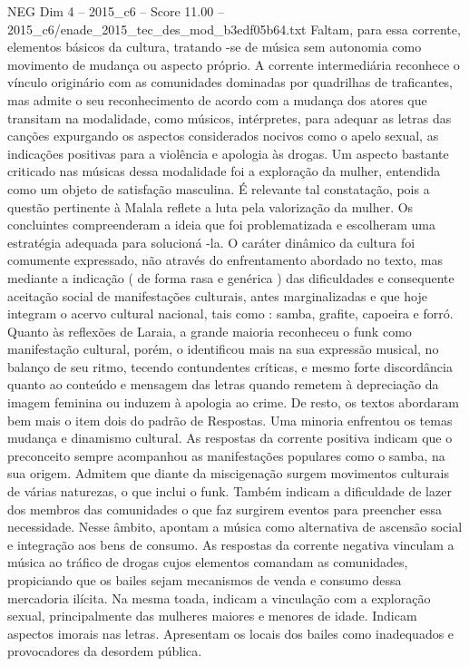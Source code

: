 \begin{textsample}{NEG Dim 4 – 2015\_c6 – Score 11.00 – 2015\_c6/enade\_2015\_tec\_des\_mod\_b3edf05b64.txt}
Faltam, para essa corrente, elementos básicos da cultura, tratando -se de música sem autonomia como movimento de mudança ou aspecto próprio.
A corrente intermediária reconhece o vínculo originário com as comunidades dominadas por quadrilhas de traficantes, mas admite o seu reconhecimento de acordo com a mudança dos atores que transitam na modalidade, como músicos, intérpretes, para adequar as letras das canções expurgando os aspectos considerados nocivos como o apelo sexual, as indicações positivas para a violência e apologia às drogas.
Um aspecto bastante criticado nas músicas dessa modalidade foi a exploração da mulher, entendida como um objeto de satisfação masculina.
É relevante tal constatação, pois a questão pertinente à Malala reflete a luta pela valorização da mulher.
Os concluintes compreenderam a ideia que foi problematizada e escolheram uma estratégia adequada para solucioná -la.
O caráter dinâmico da cultura foi comumente expressado, não através do enfrentamento abordado no texto, mas mediante a indicação ( de forma rasa e genérica ) das dificuldades e consequente aceitação social de manifestações culturais, antes marginalizadas e que hoje integram o acervo cultural nacional, tais como : samba, grafite, capoeira e forró.
Quanto às reflexões de Laraia, a grande maioria reconheceu o funk como manifestação cultural, porém, o identificou mais na sua expressão musical, no balanço de seu ritmo, tecendo contundentes críticas, e mesmo forte discordância quanto ao conteúdo e mensagem das letras quando remetem à depreciação da imagem feminina ou induzem à apologia ao crime.
De resto, os textos abordaram bem mais o item dois do padrão de Respostas.
Uma minoria enfrentou os temas mudança e dinamismo cultural.
As respostas da corrente positiva indicam que o preconceito sempre acompanhou as manifestações populares como o samba, na sua origem.
Admitem que diante da miscigenação surgem movimentos culturais de várias naturezas, o que inclui o funk.
Também indicam a dificuldade de lazer dos membros das comunidades o que faz surgirem eventos para preencher essa necessidade.
Nesse âmbito, apontam a música como alternativa de ascensão social e integração aos bens de consumo.
As respostas da corrente negativa vinculam a música ao tráfico de drogas cujos elementos comandam as comunidades, propiciando que os bailes sejam mecanismos de venda e consumo dessa mercadoria ilícita.
Na mesma toada, indicam a vinculação com a exploração sexual, principalmente das mulheres maiores e menores de idade.
Indicam aspectos imorais nas letras.
Apresentam os locais dos bailes como inadequados e provocadores da desordem pública.

\end{textsample}
